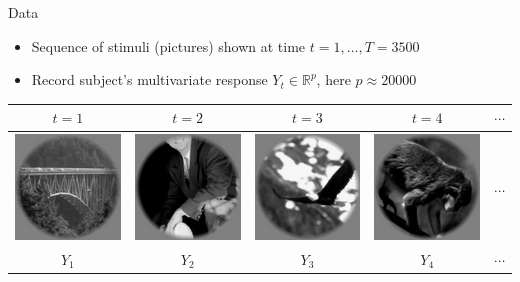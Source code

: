 \documentclass[final]{beamer}
\newlength{\onecolwid}
\begin{document}
\begin{frame}[t]
\begin{columns}[t]
\begin{column}{\onecolwid}
\begin{block}{Data}
\begin{itemize}
\item Sequence of stimuli (pictures) shown at time $t = 1,\hdots, T = 3500$
\item Record subject's multivariate response $Y_t \in \mathbb{R}^p$, here $p \approx 20000$
\end{itemize}

\begin{center}
\begin{tabular}{ccccc}
$t = 1$ & $t = 2$ & $t = 3$ & $t = 4$ & $\cdots$\\ \hline
\includegraphics[scale = 0.5]{img1.png} &
\includegraphics[scale = 0.5]{img2.png} &
\includegraphics[scale = 0.5]{img3.png} &
\includegraphics[scale = 0.5]{img4.png} & $\cdots$\\ \hline
$Y_1$ & $Y_2$ & $Y_3$ & $Y_4$ & $\cdots$\\ \hline

\end{tabular}
\end{center}
\end{block}
\end{column}
\end{columns}
\end{frame}
\end{document}
